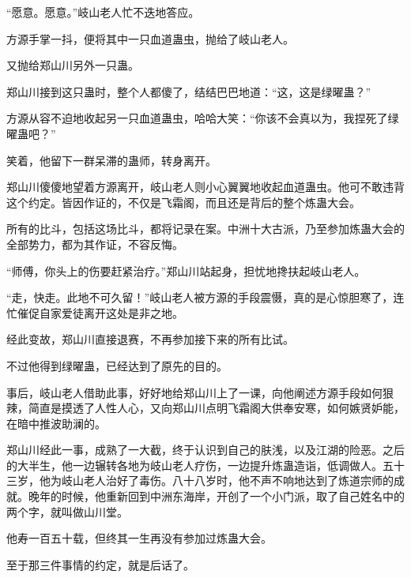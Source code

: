 \begin{this_body}
“愿意。愿意。”岐山老人忙不迭地答应。

方源手掌一抖，便将其中一只血道蛊虫，抛给了岐山老人。

又抛给郑山川另外一只蛊。

郑山川接到这只蛊时，整个人都傻了，结结巴巴地道：“这，这是绿曜蛊？”

方源从容不迫地收起另一只血道蛊虫，哈哈大笑：“你该不会真以为，我捏死了绿曜蛊吧？”

笑着，他留下一群呆滞的蛊师，转身离开。

郑山川傻傻地望着方源离开，岐山老人则小心翼翼地收起血道蛊虫。他可不敢违背这个约定。皆因作证的，不仅是飞霜阁，而且还是背后的整个炼蛊大会。

所有的比斗，包括这场比斗，都将记录在案。中洲十大古派，乃至参加炼蛊大会的全部势力，都为其作证，不容反悔。

“师傅，你头上的伤要赶紧治疗。”郑山川站起身，担忧地搀扶起岐山老人。

“走，快走。此地不可久留！”岐山老人被方源的手段震慑，真的是心惊胆寒了，连忙催促自家爱徒离开这处是非之地。

经此变故，郑山川直接退赛，不再参加接下来的所有比试。

不过他得到绿曜蛊，已经达到了原先的目的。

事后，岐山老人借助此事，好好地给郑山川上了一课，向他阐述方源手段如何狠辣，简直是摸透了人性人心，又向郑山川点明飞霜阁大供奉安寒，如何嫉贤妒能，在暗中推波助澜的。

郑山川经此一事，成熟了一大截，终于认识到自己的肤浅，以及江湖的险恶。之后的大半生，他一边辗转各地为岐山老人疗伤，一边提升炼蛊造诣，低调做人。五十三岁，他为岐山老人治好了毒伤。八十八岁时，他不声不响地达到了炼道宗师的成就。晚年的时候，他重新回到中洲东海岸，开创了一个小门派，取了自己姓名中的两个字，就叫做山川堂。

他寿一百五十载，但终其一生再没有参加过炼蛊大会。

至于那三件事情的约定，就是后话了。

\end{this_body}

